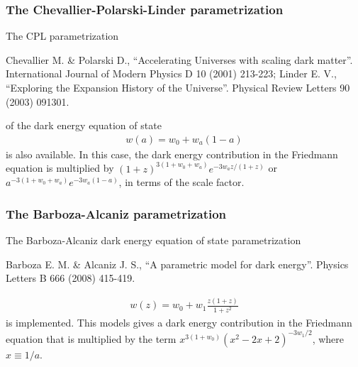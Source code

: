 \documentclass[letterpaper,12pt,english]{sphinxhowto}
\begin{document}
\subsubsection{The Chevallier-Polarski-Linder parametrization}
\label{\detokenize{themodels:the-chevallier-polarski-linder-parametrization}}
The CPL parametrization %
\begin{footnote}[2]\sphinxAtStartFootnote
Chevallier M. \& Polarski D., “Accelerating Universes with scaling dark matter”. International Journal of Modern Physics D 10 (2001) 213-223; Linder E. V., “Exploring the Expansion History of the Universe”. Physical Review Letters 90 (2003) 091301.
%
\end{footnote} of the dark energy equation of state
\begin{equation*}
\begin{split}w(a) = w_0 + w_a \left( 1-a \right)\end{split}
\end{equation*}
is also available. In this case, the dark energy contribution in the Friedmann
equation is multiplied by
\(\left(1 + z \right)^{3\left(1 + w_0 + w_a\right)} e^{-3 w_a z /\left(1 + z\right)}\)
or \(a^{-3\left(1 + w_0 + w_a\right)} e^{-3 w_a \left(1 - a\right)}\),
in terms of the scale factor.


\subsubsection{The Barboza-Alcaniz parametrization}
\label{\detokenize{themodels:the-barboza-alcaniz-parametrization}}
The Barboza-Alcaniz dark energy equation of state parametrization %
\begin{footnote}[3]\sphinxAtStartFootnote
Barboza E. M. \& Alcaniz J. S., “A parametric model for dark energy”. Physics Letters B 666 (2008) 415-419.
%
\end{footnote}
\begin{equation*}
\begin{split}w(z) = w_0 + w_1 \frac{z \left(1 + z\right)}{1 + z^2}\end{split}
\end{equation*}
is implemented.
This models gives a dark energy contribution in the Friedmann equation that is
multiplied by the term \(x^{3(1+w_0)} \left( x^2 - 2 x + 2 \right)^{-3 w_1/2}\), where \(x \equiv 1/a\).
\end{document}
